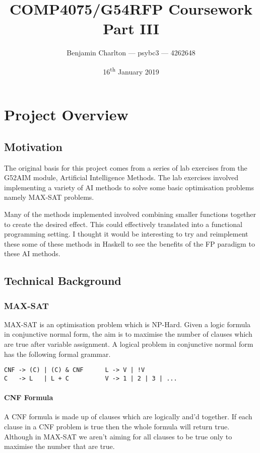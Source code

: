 \documentclass[a4paper]{article}
\title{COMP4075/G54RFP Coursework Part III}
\date{16\textsuperscript{th} January 2019}
\author{Benjamin Charlton --- psybc3 --- 4262648}
\begin{document}

\maketitle

\section{Project Overview}
\subsection{Motivation}
The original basis for this project comes from a series of lab exercises from the G52AIM module, Artificial Intelligence Methods.
The lab exercises involved implementing a variety of AI methods to solve some basic optimisation problems namely MAX-SAT problems.
\par
Many of the methods implemented involved combining smaller functions together to create the desired effect.
This could effectively translated into a functional programming setting.
I thought it would be interesting to try and reimplement these some of these methods in Haskell to see the benefits of the FP paradigm to these AI methods.

\subsection{Technical Background}
\subsubsection{MAX-SAT}
MAX-SAT is an optimisation problem which is NP-Hard.
Given a logic formula in conjunctive normal form, the aim is to maximise the number of clauses which are true after variable assignment.
A logical problem in conjunctive normal form has the following formal grammar.
\begin{lstlisting}
CNF -> (C) | (C) & CNF      L -> V | !V
C   -> L   | L + C          V -> 1 | 2 | 3 | ...
\end{lstlisting}
\paragraph{CNF Formula}\vspace*{-6mm}
A CNF formula is made up of clauses which are logically and'd together.
If each clause in a CNF problem is true then the whole formula will return true.
Although in MAX-SAT we aren't aiming for all clauses to be true only to maximise the number that are true.
\end{document}
